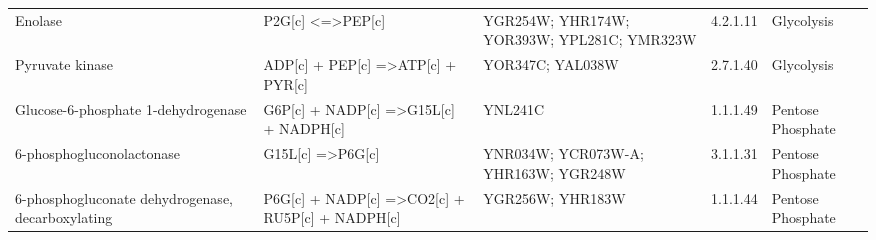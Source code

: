 {\begin{landscape}
\begin{longtable}{p{.25\linewidth} | p{.40\linewidth} | p{.19\linewidth} | p{.05\linewidth} | p{.10\linewidth}}
Enolase                                                                                   & P2G{[}c{]} \textless{}=\textgreater PEP{[}c{]}                                                                                                  & YGR254W; YHR174W; YOR393W; YPL281C; YMR323W                                                                                                                      & 4.2.1.11           & Glycolysis                                                                  \\
Pyruvate kinase                                                                           & ADP{[}c{]} + PEP{[}c{]} =\textgreater ATP{[}c{]} + PYR{[}c{]}                                                                                   & YOR347C; YAL038W                                                                                                                                                 & 2.7.1.40           & Glycolysis                                                                  \\
Glucose-6-phosphate 1-dehydrogenase                                                       & G6P{[}c{]} + NADP{[}c{]} =\textgreater G15L{[}c{]} + NADPH{[}c{]}                                                                               & YNL241C                                                                                                                                                          & 1.1.1.49           & Pentose Phosphate                                                           \\
6-phosphogluconolactonase                                                                 & G15L{[}c{]} =\textgreater P6G{[}c{]}                                                                                                            & YNR034W; YCR073W-A; YHR163W; YGR248W                                                                                                                             & 3.1.1.31           & Pentose Phosphate                                                           \\
6-phosphogluconate dehydrogenase, decarboxylating                                         & P6G{[}c{]} + NADP{[}c{]} =\textgreater CO2{[}c{]} + RU5P{[}c{]} + NADPH{[}c{]}                                                                  & YGR256W; YHR183W                                                                                                                                                 & 1.1.1.44           & Pentose Phosphate                                                           \\

\end{longtable}
\end{landscape}}
